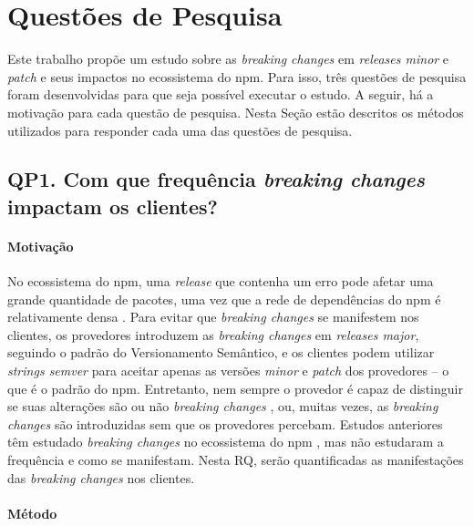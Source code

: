 \chapter{Questões de Pesquisa}
\label{cap:qp}

Este trabalho propõe um estudo sobre as \textit{breaking changes} em \textit{releases minor} e \textit{patch} e seus impactos no ecossistema do \textsf{npm}. Para isso, três questões de pesquisa foram desenvolvidas para que seja possível executar o estudo. A seguir, há a motivação para cada questão de pesquisa. Nesta Seção estão descritos os métodos utilizados para responder cada uma das questões de pesquisa.


\section{QP1. Com que frequência \textit{breaking changes} impactam os clientes?}
\label{sec:qp1}

\subsubsection{Motivação}
\label{sec:qp1:motivation}
No ecossistema do \textsf{npm}, uma \textit{release} que contenha um erro pode afetar uma grande quantidade de pacotes, uma vez que a rede de dependências do \textsf{npm} é relativamente densa \cite{teorical_reference:npm_2}. Para evitar que \textit{breaking changes} se manifestem nos clientes, os provedores introduzem as \textit{breaking changes} em \textit{releases major}, seguindo o padrão do Versionamento Semântico, e os clientes podem utilizar \textit{strings semver} para aceitar apenas as versões \textit{minor} e \textit{patch} dos provedores -- o que é o padrão do \textsf{npm}. Entretanto, nem sempre o provedor é capaz de distinguir se suas alterações são ou não \textit{breaking changes} \cite{noregrets2018}, ou, muitas vezes, as \textit{breaking changes} são introduzidas sem que os provedores percebam. Estudos anteriores têm estudado \textit{breaking changes} no ecossistema do \textsf{npm} \cite{using_others_tests, noregrets2018, intro:break_change, teorical_reference:bc_1}, mas não estudaram a frequência e como se manifestam. Nesta RQ, serão quantificadas as manifestações das \textit{breaking changes} nos clientes.

\subsubsection{Método}
\label{sec:qp1:approach}

